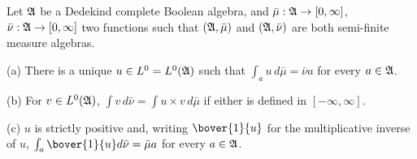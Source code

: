  Let $\frak A$ be a Dedekind complete Boolean
algebra, and $\bar\mu:\frak A\to[0,\infty]$,
$\bar\nu:\frak A\to[0,\infty]$ two functions such that
$(\frak A,\bar\mu)$ and 
$(\frak A,\bar\nu)$ are both semi-finite measure algebras.
     
(a) There is a
unique $u\in L^0=L^0(\frak A)$ such that $\int_au\,d\bar\mu=\bar\nu a$
for every $a\in\frak A$.
     
(b) For $v\in L^0(\frak A)$, 
$\int v\,d\bar\nu=\int u\times v\,d\bar\mu$ if either is defined in
$[-\infty,\infty]$.
     
(c) $u$ is strictly positive and, writing $\bover{1}{u}$ for the multiplicative
inverse of $u$, $\int_a\bover{1}{u}d\bar\nu=\bar\mu a$ for every
$a\in\frak A$.
     
